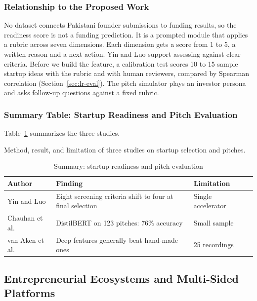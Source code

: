 \documentclass{FastFyp}
\makeatletter
\newcommand{\capdesc}[1]{%
  \par\nobreak
  \begingroup
  \setstretch{1}%
  \ifdefstring{\@captype}{figure}%
    {\vspace{0.2\baselineskip}}%
    {\vspace{-0.8\baselineskip}}%
  {\centering\normalfont\itshape\small
   \begin{minipage}{0.92\textwidth}\centering #1\end{minipage}\par}%
  \endgroup
  \vspace{0.4\baselineskip}%
}
\makeatother
\begin{document}
\subsubsection{Relationship to the Proposed Work}
No dataset connects Pakistani founder submissions to funding results, so the readiness score is not a funding prediction. It is a prompted module that applies a rubric across seven dimensions. Each dimension gets a score from 1 to 5, a written reason and a next action. Yin and Luo support assessing against clear criteria. Before we build the feature, a calibration test scores 10 to 15 sample startup ideas with the rubric and with human reviewers, compared by Spearman correlation (Section~\ref{sec:lr-eval}). The pitch simulator plays an investor persona and asks follow-up questions against a fixed rubric.

\subsubsection{Summary Table: Startup Readiness and Pitch Evaluation}
Table~\ref{tab:lr-readiness} summarizes the three studies.
\begin{table}[!ht]
\centering
\caption{Summary: startup readiness and pitch evaluation}
\capdesc{Method, result, and limitation of three studies on startup selection and pitches.}
\begin{tabular}{|p{3.0cm}|p{4.0cm}|p{2.8cm}|p{4.0cm}|}
\hline
\textbf{Author} & \textbf{Finding} & \textbf{Limitation} \\
\hline
Yin and Luo \cite{ref:yin2018accelerator} & Eight screening criteria shift to four at final selection & Single accelerator \\
\hline
Chauhan et al. \cite{ref:chauhan2024pitch} & DistilBERT on 123 pitches: 76\% accuracy & Small sample \\
\hline
van Aken et al. \cite{ref:vanaken2023} & Deep features generally beat hand-made ones & 25 recordings \\
\hline
\end{tabular}
\label{tab:lr-readiness}
\end{table}

\subsection{Entrepreneurial Ecosystems and Multi-Sided Platforms}
\end{document}
